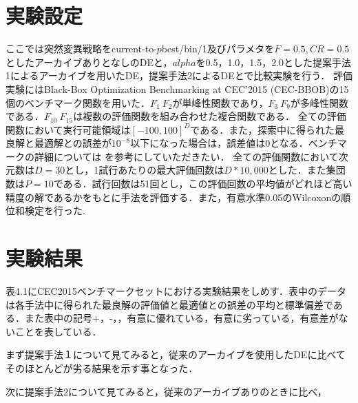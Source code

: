 \documentclass[a4paper,11pt,oneside,openany]{jsbook}
\begin{document}
\section{実験設定}
ここでは突然変異戦略をcurrent-to-$p$best/bin/1及びパラメタを$F=0.5,CR=0.5$としたアーカイブありとなしのDEと，$alpha$を0.5，1.0，1.5，2.0とした提案手法1によるアーカイブを用いたDE，提案手法2によるDEとで比較実験を行う．
評価実験にはBlack-Box Optimization Benchmarking at CEC'2015 (CEC-BBOB)の15個のベンチマーク関数を用いた．$F_{1}~F_{2}$が単峰性関数であり，$F_3~F_9$が多峰性関数である．$F_{10}~F_{15}$は複数の評価関数を組み合わせた複合関数である．
全ての評価関数において実行可能領域は$[-100,100]^D$である．また，探索中に得られた最良解と最適解との誤差が$10^{-8}$以下になった場合は，誤差値は0となる．ベンチマークの詳細については \cite{CEC2015} を参考にしていただきたい．
全ての評価関数において次元数は$D=30$とし，1試行あたりの最大評価回数は$D*10,000$とした．また集団数は$P=10$である．試行回数は51回とし，この評価回数の平均値がどれほど高い精度の解であるかをもとに手法を評価する．また，有意水準0.05のWilcoxonの順位和検定を行った.


\section{実験結果}
表4.1にCEC2015ベンチマークセットにおける実験結果をしめす．表中のデータは各手法中に得られた最良解の評価値と最適値との誤差の平均と標準偏差である．また表中の記号+，-，，有意に優れている，有意に劣っている，有意差がないことを表している．

まず提案手法１について見てみると，従来のアーカイブを使用したDEに比べてそのほとんどが劣る結果を示す事となった．

次に提案手法2について見てみると，従来のアーカイブありのときに比べ，
\end{document}
